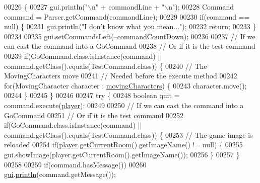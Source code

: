 \begin{DoxyCode}
00226                                                    \{
00227         gui.println(\textcolor{stringliteral}{"\(\backslash\)n"} + commandLine + \textcolor{stringliteral}{"\(\backslash\)n"});
00228         Command command = Parser.getCommand(commandLine);
00229 
00230         \textcolor{keywordflow}{if}(command == null) \{
00231             gui.println(\textcolor{stringliteral}{"I don't know what you mean..."});
00232             \textcolor{keywordflow}{return};
00233         \}
00234 
00235         gui.setCommandsLeft(--\hyperlink{classpkg__game_1_1GameEngine_af4ea44f51563b4e2c0a67fe918bf5e3c}{commandCountDown});
00236 
00237         \textcolor{comment}{// If we can cast the command into a GoCommand}
00238         \textcolor{comment}{// Or if it is the test command}
00239         \textcolor{keywordflow}{if}(GoCommand.class.isInstance(command) || command.getClass().equals(TestCommand.class)) \{
00240             \textcolor{comment}{// The MovingCharacters move}
00241             \textcolor{comment}{// Needed before the execute method}
00242             \textcolor{keywordflow}{for}(MovingCharacter character : \hyperlink{classpkg__game_1_1GameEngine_a64a7051b0ae6fb816d566be8ddbab3cb}{movingCharacters}) \{
00243                 character.move();
00244             \}
00245         \}
00246 
00247         \textcolor{keywordflow}{try} \{
00248             \textcolor{keywordtype}{boolean} quit = command.execute(\hyperlink{classpkg__game_1_1GameEngine_a864d14b3375ad026e700ba0c0b9f9d2d}{player});
00249 
00250             \textcolor{comment}{// If we can cast the command into a GoCommand}
00251             \textcolor{comment}{// Or if it is the test command}
00252             \textcolor{keywordflow}{if}(GoCommand.class.isInstance(command) || command.getClass().equals(TestCommand.class)) \{
00253                 \textcolor{comment}{// The game image is reloaded}
00254                 \textcolor{keywordflow}{if}(\hyperlink{classpkg__game_1_1GameEngine_a864d14b3375ad026e700ba0c0b9f9d2d}{player}.\hyperlink{classpkg__world_1_1Player_a5ff0ede152d97c0c9cf6603c9a422a77}{getCurrentRoom}().getImageName() != null) \{
00255                     gui.showImage(player.getCurrentRoom().getImageName());
00256                 \}
00257             \}
00258 
00259             \textcolor{keywordflow}{if}(command.hasMessage())
00260                 \hyperlink{classpkg__game_1_1GameEngine_a152cd31474cc8a5980e32c2cab6e7d36}{gui}.\hyperlink{classpkg__game_1_1UserInterface_ac4d82f989416d7cc64a6e2fba2f4ed75}{println}(command.getMessage());

\end{DoxyCode}
